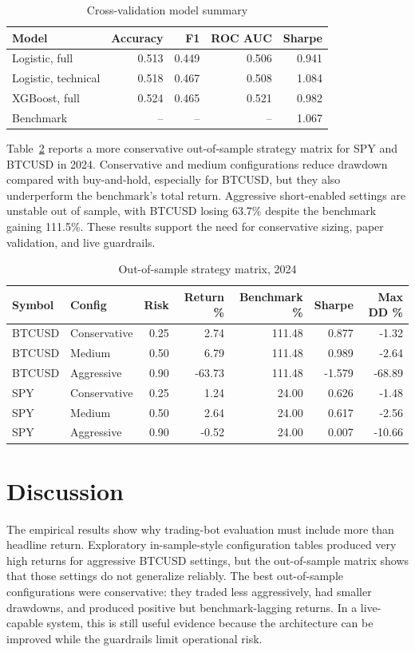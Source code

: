 \documentclass[sigconf,nonacm]{acmart}
\begin{document}
\begin{table}[h]
  \caption{Cross-validation model summary}
  \label{tab:model-results}
  \centering
  \begin{tabular}{lrrrr}
    \toprule
    Model & Accuracy & F1 & ROC AUC & Sharpe \\
    \midrule
    Logistic, full & 0.513 & 0.449 & 0.506 & 0.941 \\
    Logistic, technical & 0.518 & 0.467 & 0.508 & 1.084 \\
    XGBoost, full & 0.524 & 0.465 & 0.521 & 0.982 \\
    Benchmark & -- & -- & -- & 1.067 \\
    \bottomrule
  \end{tabular}
\end{table}

Table~\ref{tab:oos-results} reports a more conservative out-of-sample strategy matrix for SPY and BTCUSD in 2024. Conservative and medium configurations reduce drawdown compared with buy-and-hold, especially for BTCUSD, but they also underperform the benchmark's total return. Aggressive short-enabled settings are unstable out of sample, with BTCUSD losing 63.7\% despite the benchmark gaining 111.5\%. These results support the need for conservative sizing, paper validation, and live guardrails.

\begin{table}[t]
  \caption{Out-of-sample strategy matrix, 2024}
  \label{tab:oos-results}
  \centering
  \begin{tabular}{llrrrrr}
    \toprule
    Symbol & Config & Risk & Return \% & Benchmark \% & Sharpe & Max DD \% \\
    \midrule
    BTCUSD & Conservative & 0.25 & 2.74 & 111.48 & 0.877 & -1.32 \\
    BTCUSD & Medium & 0.50 & 6.79 & 111.48 & 0.989 & -2.64 \\
    BTCUSD & Aggressive & 0.90 & -63.73 & 111.48 & -1.579 & -68.89 \\
    SPY & Conservative & 0.25 & 1.24 & 24.00 & 0.626 & -1.48 \\
    SPY & Medium & 0.50 & 2.64 & 24.00 & 0.617 & -2.56 \\
    SPY & Aggressive & 0.90 & -0.52 & 24.00 & 0.007 & -10.66 \\
    \bottomrule
  \end{tabular}
\end{table}

\section{Discussion}
The empirical results show why trading-bot evaluation must include more than headline return. Exploratory in-sample-style configuration tables produced very high returns for aggressive BTCUSD settings, but the out-of-sample matrix shows that those settings do not generalize reliably. The best out-of-sample configurations were conservative: they traded less aggressively, had smaller drawdowns, and produced positive but benchmark-lagging returns. In a live-capable system, this is still useful evidence because the architecture can be improved while the guardrails limit operational risk.
\end{document}

